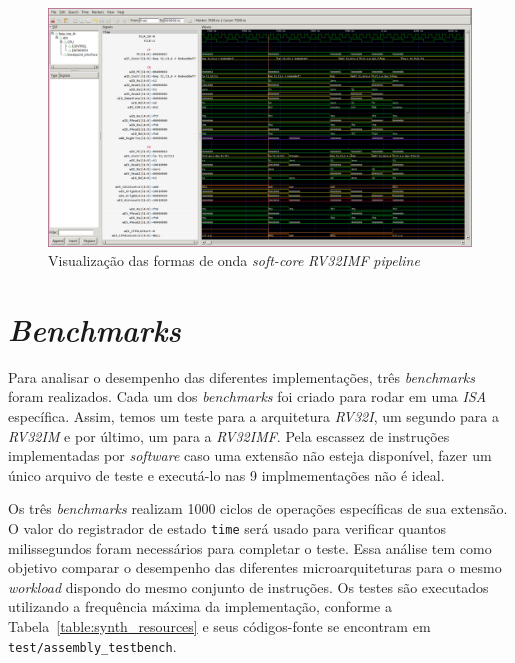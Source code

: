     \begin{figure}[H]
    \centering
        \includegraphics[width=0.9\linewidth]{../images/gtkwave/gtkwave_pipe.png}
        \caption{Visualização das formas de onda \textit{soft-core} \textit{RV32IMF} \textit{pipeline}}
        \label{fig:gtkwave_pipe}
    \end{figure}

\section{\textit{Benchmarks}}
    { Para analisar o desempenho das diferentes implementações, três \textit{benchmarks}
        foram realizados. Cada um dos \textit{benchmarks} foi criado para rodar
        em uma \textit{ISA} específica. Assim, temos um teste para a arquitetura
        \textit{RV32I}, um segundo para a \textit{RV32IM} e por último, um para a
        \textit{RV32IMF}. Pela escassez de instruções implementadas por \textit{software}
        caso uma extensão não esteja disponível, fazer um único arquivo de teste
        e executá-lo nas 9 implmementações não é ideal.
    }

    { Os três \textit{benchmarks} realizam 1000 ciclos de operações específicas de sua
        extensão. O valor do registrador de estado \texttt{time} será usado para verificar
        quantos milissegundos foram necessários para completar o teste.  Essa análise tem
        como objetivo comparar o desempenho das diferentes microarquiteturas para o mesmo
        \textit{workload} dispondo do mesmo conjunto de instruções. Os testes são executados
        utilizando a frequência máxima da implementação, conforme a
        Tabela~\ref{table:synth_resources} e seus códigos-fonte se encontram
        em \texttt{test/assembly\_testbench}.
    }

